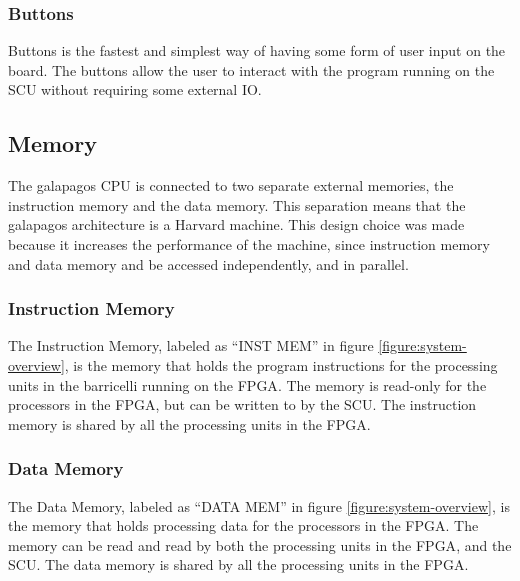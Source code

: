 \subsubsection{Buttons}

Buttons is the fastest and simplest way of having some form of user input on the board.
The buttons allow the user to interact with the program running on the SCU without requiring some external IO.

\subsection{Memory}

The \Gls{galapagos} CPU is connected to two separate external memories, the instruction memory and the data memory.
This separation means that the \Gls{galapagos} architecture is a Harvard machine.
This design choice was made because it increases the performance of the machine, since instruction memory and data memory and be accessed independently, and in parallel. 

\subsubsection{Instruction Memory}

The Instruction Memory, labeled as ``INST MEM'' in figure \vref{figure:system-overview}, is the memory that holds the program instructions for the processing units in the \Gls{barricelli} running on the \gls{FPGA}.
The memory is read-only for the processors in the \gls{FPGA}, but can be written to by the \gls{SCU}.
The instruction memory is shared by all the processing units in the \gls{FPGA}.

\subsubsection{Data Memory}

The Data Memory, labeled as ``DATA MEM'' in figure \vref{figure:system-overview}, is the memory that holds processing data for the processors in the \gls{FPGA}.
The memory can be read and read by both the processing units in the \gls{FPGA}, and the \gls{SCU}.
The data memory is shared by all the processing units in the \gls{FPGA}.
